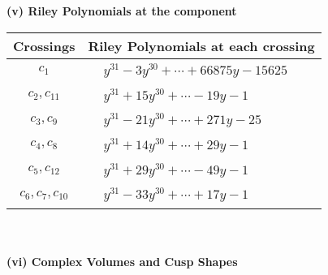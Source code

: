 \documentclass[1p]{elsarticle_modified}
\theoremstyle{definition}
\begin{document}
\newpage\renewcommand{\arraystretch}{1}
\flushleft \textbf{(v) Riley Polynomials at the component}\newline \\
\begin{tabular}{m{50pt}|m{274pt}}
Crossings & \hspace{64pt}Riley Polynomials at each crossing \\
\hline $$\begin{aligned}c_{1}\end{aligned}$$&$\begin{aligned}
&y^{31}-3 y^{30}+\cdots+66875 y-15625
\end{aligned}$\\
\hline $$\begin{aligned}c_{2},c_{11}\end{aligned}$$&$\begin{aligned}
&y^{31}+15 y^{30}+\cdots-19 y-1
\end{aligned}$\\
\hline $$\begin{aligned}c_{3},c_{9}\end{aligned}$$&$\begin{aligned}
&y^{31}-21 y^{30}+\cdots+271 y-25
\end{aligned}$\\
\hline $$\begin{aligned}c_{4},c_{8}\end{aligned}$$&$\begin{aligned}
&y^{31}+14 y^{30}+\cdots+29 y-1
\end{aligned}$\\
\hline $$\begin{aligned}c_{5},c_{12}\end{aligned}$$&$\begin{aligned}
&y^{31}+29 y^{30}+\cdots-49 y-1
\end{aligned}$\\
\hline $$\begin{aligned}c_{6},c_{7},c_{10}\end{aligned}$$&$\begin{aligned}
&y^{31}-33 y^{30}+\cdots+17 y-1
\end{aligned}$\\
\hline
\end{tabular}\\~\\
\newpage\flushleft \textbf{(vi) Complex Volumes and Cusp Shapes}
\end{document}
